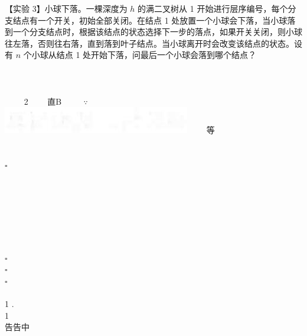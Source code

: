 \documentclass[10pt]{article}
\begin{document}
【实验 3】小球下落。一棵深度为 $h$ 的满二叉树从 1 开始进行层序编号，每个分支结点有一个开关，初始全部关闭。在结点 1 处放置一个小球会下落，当小球落到一个分支结点时，根据该结点的状态选择下一步的落点，如果开关关闭，则小球往左落，否则往右落，直到落到叶子结点。当小球离开时会改变该结点的状态。设有 $n$ 个小球从结点 1 处开始下落，问最后一个小球会落到哪个结点？\\
$\qquad$\\
$\qquad$\\
$\qquad$\\
$\qquad$ 2 $\qquad$直B $\qquad$ $\because$\\
\includegraphics[max width=\textwidth]{2025_06_06_704745ea57b15b2333e5g-183} $\qquad$等 $\qquad$\\
$\qquad$\\
$\qquad$\\
$\square$\\
$\qquad$\\
$\qquad$\\
$\qquad$\\
$\qquad$\\
$\qquad$\\
$\qquad$\\
$\qquad$\\
$\square$\\
$\square$\\
$\square$\\
$\qquad$\\
1 .\\
1\\
告告中\\
$\qquad$\\
$\qquad$\\
$\qquad$\\
$\qquad$\\
$\qquad$\\
$\qquad$\\
$\qquad$\\
$\qquad$\\
$\qquad$\\
$\qquad$\\
$\qquad$

$\qquad$\\
$\qquad$\\
$\qquad$\\
$\qquad$
\end{document}
